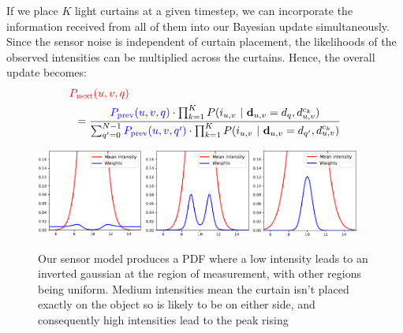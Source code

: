 If we place $K$ light curtains at a given timestep, we can incorporate the information received from all of them into our Bayesian update simultaneously. Since the sensor noise is independent of curtain placement, the likelihoods of the observed intensities can be multiplied across the curtains. Hence, the overall update becomes: 
\begin{align*}
   &\after{q} \\
   &\hspace{5pt}= \frac{\before{q} \cdot \prod_{k=1}^K P(i_{u, v}\ |\ \dd_{u, v} = d_q, d^{c_k}_{u, v})}{\sum_{\qb=0}^{N-1} \before{\qb} \cdot \prod_{k=1}^K P(i_{u, v}\ |\ \dd_{u, v} = d_{\qb}, d^{c_k}_{u, v})}
\end{align*} 

\begin{figure}[h]
   \centering
   \begin{minipage}{0.5\textwidth}
       \centering
       \includegraphics[width=0.31\textwidth]{figures/aa.pdf}
       \includegraphics[width=0.31\textwidth]{figures/bb.pdf}
       \includegraphics[width=0.31\textwidth]{figures/cc.pdf}
   \end{minipage}\hfill
   \centering
   \caption{Our sensor model produces a PDF where a low intensity leads to an inverted gaussian at the region of measurement, with other regions being uniform. Medium intensities mean the curtain isn't placed exactly on the object so is likely to be on either side, and consequently high intensities lead to the peak rising}
   \label{fig:updatemodel}
\end{figure}

